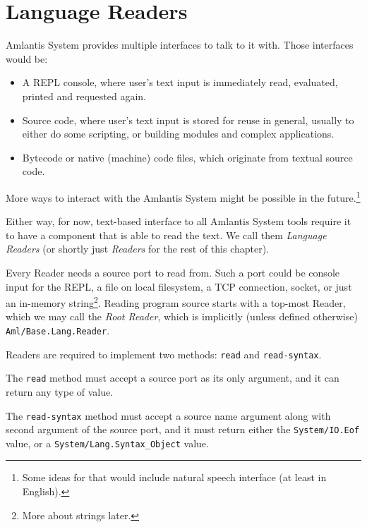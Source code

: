 
\chapter{Language Readers}
\label{sec:environment-language-readers}

Amlantis System provides multiple interfaces to talk to it with. Those interfaces would be:

\begin{itemize}
  \item A REPL console, where user's text input is immediately read, evaluated, printed and requested again.
  \item Source code, where user's text input is stored for reuse in general, usually to either do some scripting, or building modules and complex applications. 
  \item Bytecode or native (machine) code files, which originate from textual source code.
\end{itemize}

More ways to interact with the Amlantis System might be possible in the future.\footnote{Some ideas for that would include natural speech interface (at least in English).}

Either way, for now, text-based interface to all Amlantis System tools require it to have a component that is able to read the text. We call them {\em Language Readers} (or shortly just {\em Readers} for the rest of this chapter).

Every Reader needs a source port to read from. Such a port could be console input for the REPL, a file on local filesystem, a TCP connection, socket, or just an in-memory string\footnote{More about strings later.}. Reading program source starts with a top-most Reader, which we may call the {\em Root Reader}, which is implicitly (unless defined otherwise) \lstinline!Aml/Base.Lang.Reader!.

Readers are required to implement two methods: \lstinline!read! and \lstinline!read-syntax!. 

The \lstinline!read! method must accept a source port as its only argument, and it can return any type of value.

The \lstinline!read-syntax! method must accept a source name argument along with second argument of the source port, and it must return either the \lstinline!System/IO.Eof! value, or a \lstinline!System/Lang.Syntax_Object! value.

